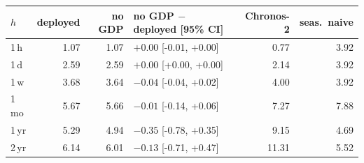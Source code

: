 \begin{tabular}{lrrlrr}
\toprule
$h$ & deployed & no GDP & no GDP $-$ deployed [95\% CI] & Chronos-2 & seas.\ naive \\
\midrule
1\,h & 1.07 & 1.07 & $+0.00$ [-0.01, +0.00] & 0.77 & 3.92 \\
1\,d & 2.59 & 2.59 & $+0.00$ [+0.00, +0.00] & 2.14 & 3.92 \\
1\,w & 3.68 & 3.64 & $-0.04$ [-0.04, +0.02] & 4.00 & 3.92 \\
1\,mo & 5.67 & 5.66 & $-0.01$ [-0.14, +0.06] & 7.27 & 7.88 \\
1\,yr & 5.29 & 4.94 & $-0.35$ [-0.78, +0.35] & 9.15 & 4.69 \\
2\,yr & 6.14 & 6.01 & $-0.13$ [-0.71, +0.47] & 11.31 & 5.52 \\
\bottomrule
\end{tabular}
